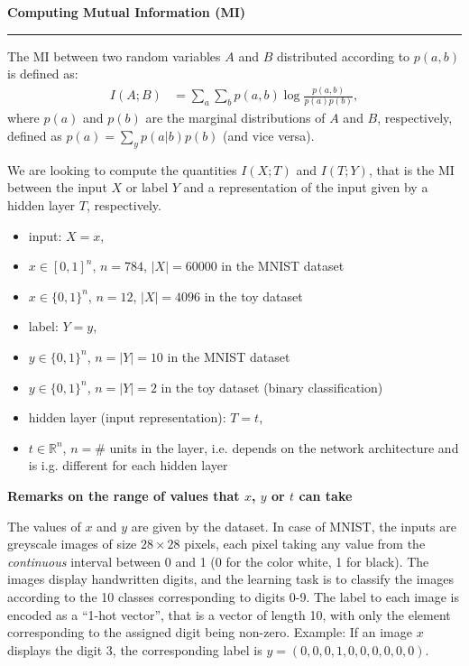 \documentclass[12pt]{report}
\author{Anna Golubeva}
\begin{document}
\begin{center}
{\bf\Large{Computing Mutual Information (MI)}}\\
\end{center}
\noindent\rule{\textwidth}{0.4pt}

The MI between two random variables $A$ and $B$ distributed according to $p(a,b)$ is defined as:
\begin{align}
I(A;B) &= \sum \limits_{a} \sum \limits_{b} p(a,b) \log\frac{p(a,b)}{p(a)p(b)},
\end{align}
where $p(a)$ and $p(b)$ are the marginal distributions of $A$ and $B$, respectively, defined as $p(a) = \sum_y p(a|b)p(b)$ (and vice versa).

We are looking to compute the quantities $I(X;T)$ and $I(T;Y)$, that is the MI between the input $X$ or label $Y$ and a representation of the input given by a hidden layer $T$, respectively.
\begin{itemize}
\item input: $X=x$,
\item[] $x\in [0,1]^n$, $n=784$, $|X| = 60000$ in the MNIST dataset
\item[] $x\in \{0,1\}^n$, $n=12$, $|X| = 4096$ in the toy dataset
\item label: $Y=y$,
\item[] $y\in \{0,1\}^n$, $n = |Y| = 10$ in the MNIST dataset
\item[] $y\in \{0,1\}^n$, $n= |Y| = 2$ in the toy dataset (binary classification)
\item hidden layer (input representation): $T=t$,
\item[] $t\in\mathbb{R}^n$, $n=\#$ units in the layer, i.e. depends on the network architecture and is i.g. different for each hidden layer
\end{itemize}

\vspace{1cm}
{\bf Remarks on the range of values that $x$, $y$ or $t$ can take}

The values of $x$ and $y$ are given by the dataset. In case of MNIST, the inputs are greyscale images of size $28\times 28$ pixels, each pixel taking any value from the {\it continuous} interval between 0 and 1 (0 for the color white, 1 for black). The images display handwritten digits, and the learning task is to classify the images according to the 10 classes corresponding to digits 0-9. The label to each image is encoded as a ``1-hot vector'', that is a vector of length 10, with only the element corresponding to the assigned digit being non-zero. Example: If an image $x$ displays the digit 3, the corresponding label is $y = (0,0,0,1,0,0,0,0,0,0)$.
\end{document}
